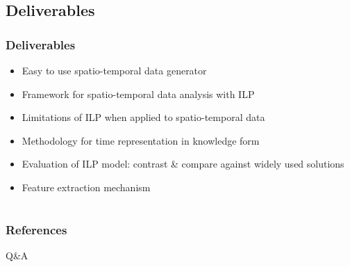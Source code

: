 \documentclass[09pt]{beamer}
\begin{document}
  \subsection{Deliverables}
  \begin{frame}%
    \frametitle{Deliverables}
    \begin{itemize}
      \item Easy to use spatio-temporal data generator
      \item Framework for spatio-temporal data analysis with ILP
      \item Limitations of ILP when applied to spatio-temporal data
      \item Methodology for time representation in knowledge form
      \item Evaluation of ILP model: contrast \& compare against widely used solutions
      \item Feature extraction mechanism
    \end{itemize}
  \end{frame}




\section*{}%
  \begin{frame}
    \frametitle{References}
    
    
  \end{frame}

  \begin{frame}[plain]
    \centering \Huge Q\&A \par
  \end{frame}
\end{document}

